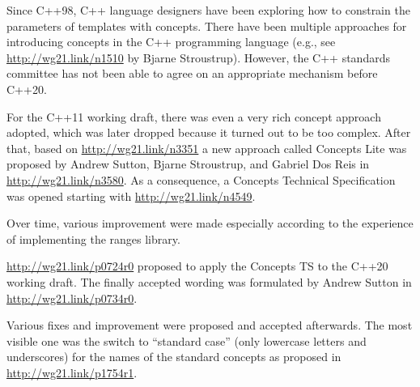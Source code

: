 Since C++98, C++ language designers have been exploring how to constrain the parameters of templates with concepts. There have been multiple approaches for introducing concepts in the C++ programming language (e.g., see \url{http://wg21.link/n1510} by Bjarne Stroustrup). However, the C++ standards committee has not been able to agree on an appropriate mechanism before C++20.

For the C++11 working draft, there was even a very rich concept approach adopted, which was later dropped because it turned out to be too complex. After that, based on \url{http://wg21.link/n3351} a new approach called Concepts Lite was proposed by Andrew Sutton, Bjarne Stroustrup, and Gabriel Dos Reis in \url{http://wg21.link/n3580}. As a consequence, a Concepts Technical Specification was opened starting with \url{http://wg21.link/n4549}.

Over time, various improvement were made especially according to the experience of implementing the ranges library.

\url{http://wg21.link/p0724r0} proposed to apply the Concepts TS to the C++20 working draft. The finally accepted wording was formulated by Andrew Sutton in \url{http://wg21.link/p0734r0}.

Various fixes and improvement were proposed and accepted afterwards. The most visible one was the switch to “standard case” (only lowercase letters and underscores) for the names of the standard concepts as proposed in \url{http://wg21.link/p1754r1}.